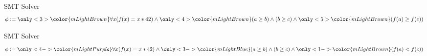 \documentclass[aspectratio=169,10pt]{beamer}
\begin{document}
{{
}
\begin{frame}
\maketitle
\end{frame}
}

\begin{frame}{SMT Solver}
\begin{equation*}
	\phi :=
	{\only<3>{\color{mLightBrown}}\forall x (f(x) = x * 42)} \land
	{\only<4>{\color{mLightBrown}}(a \ge b) \land (b \ge c)} \land
	{\only<5>{\color{mLightBrown}}(f(a) \ge f(c))}
\end{equation*}
\begin{center}
 {}
 {}
 {}
\end{center}
\end{frame}

\begin{frame}{SMT Solver}
\begin{equation*}
	\phi :=
	{\only<4->{\color{mLightPurple}}\forall x (f(x) = x * 42)} \land
	{\only<3->{\color{mLightBlue}}(a \ge b) \land (b \ge c)} \land
	{\only<1->{\color{mLightBrown}}(f(a) < f(c))}
\end{equation*}
\begin{center}
\end{center}
\end{frame}
\end{document}
